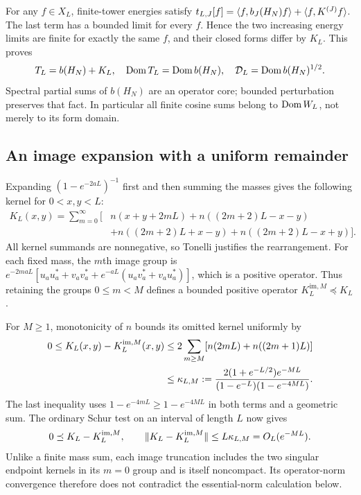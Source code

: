 For any $f\in X_L$, finite-tower energies satisfy
$t_{L,J}[f]=\langle f,b_J(H_N)f\rangle+\langle f,K^{(J)}f\rangle$.
The last term has a bounded limit for every $f$. Hence the two increasing
energy limits are finite for exactly the same $f$, and their closed forms
differ by $K_L$. This proves
\begin{equation}\label{d:domains}
T_L=b(H_N)+K_L,\quad\operatorname{Dom} T_L=\operatorname{Dom} b(H_N),\quad
\mathcal D_L=\operatorname{Dom} b(H_N)^{1/2}.
\end{equation}
Spectral partial sums of $b(H_N)$ are an operator core; bounded perturbation
preserves that fact. In particular all finite cosine sums belong to
$\operatorname{Dom} W_L$, not merely to its form domain.

\subsection{An image expansion with a uniform remainder}\label{d:image-section}
Expanding $(1-e^{-2aL})^{-1}$ first and then summing the masses gives
the following kernel for $0<x,y<L$:
\begin{equation}\label{d:image-kernel}
\begin{split}
K_L(x,y)=\sum_{m=0}^{\infty}\bigl[&n(x+y+2mL)
+n((2m+2)L-x-y)\\
&+n((2m+2)L+x-y)+n((2m+2)L-x+y)\bigr].
\end{split}
\end{equation}
All kernel summands are nonnegative, so Tonelli justifies the rearrangement.
For each fixed mass, the $m$th image group is
$e^{-2maL}[u_au_a^*+v_av_a^*+e^{-aL}(u_av_a^*+v_au_a^*)]$,
which is a positive operator. Thus retaining the groups $0\le m<M$
defines a bounded positive operator $K_L^{\mathrm{im},M}\preceq K_L$.

For $M\ge1$, monotonicity of $n$ bounds its omitted kernel uniformly by
\begin{align}
0\le K_L(x,y)-K_L^{\mathrm{im},M}(x,y)
&\le2\sum_{m\ge M}[n(2mL)+n((2m+1)L)]\notag\\
&\le\kappa_{L,M}:=
\frac{2(1+e^{-L/2})e^{-ML}}
{(1-e^{-L})(1-e^{-4ML})}.\label{d:image-tail}
\end{align}
The last inequality uses
$1-e^{-4mL}\ge1-e^{-4ML}$ in both terms and a geometric sum.
The ordinary Schur test on an interval of length $L$ now gives
\begin{equation}\label{d:image-norm}
0\preceq K_L-K_L^{\mathrm{im},M},\qquad
\lVert K_L-K_L^{\mathrm{im},M}\rVert\le L\kappa_{L,M}=O_L(e^{-ML}).
\end{equation}
Unlike a finite mass sum, each image truncation includes the two singular
endpoint kernels in its $m=0$ group and is itself noncompact. Its
operator-norm convergence therefore does not contradict the essential-norm
calculation below.

